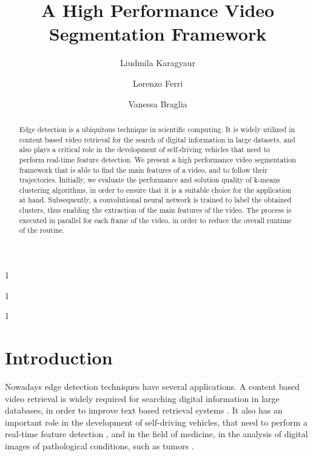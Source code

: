 \documentclass{usiinftr}
\begin{document}
%
%
\title{A High Performance Video Segmentation Framework}

%
%
\author{Liudmila Karagyaur}{1}
\author{Lorenzo Ferri}{1}
\author{Vanessa Braglia}{1}

%
%

%
%

%
%

%
%


\maketitle

\begin{abstract}
Edge detection is a ubiquitous technique in scientific computing. It is widely utilized in content based video retrieval for the search of digital information in large datasets, and also plays a critical role in the development of self-driving vehicles that need to perform real-time feature detection.
We present a high performance video segmentation framework that is able to find the main features of a video, and to follow their trajectories. Initially, we evaluate the performance and solution quality of k-means clustering algorithms, in order to ensure that it is a suitable choice for the application at hand. Subsequently, a convolutional neural network is trained to label the obtained clusters, thus enabling the extraction of the main features of the video. The process is executed in parallel for each frame of the video, in order to reduce the overall runtime of the routine.
\end{abstract}

\section{Introduction}
Nowadays edge detection techniques have several applications. A content based video retrieval is widely required for searching digital information in large databases, in order to improve text based retrieval systems \cite{1}. It also has an important role in the development of self-driving vehicles, that need to perform a real-time feature detection \cite{2}, and in the field of medicine, in the analysis of digital images of pathological conditions, such as tumors \cite{3}.
\end{document}
